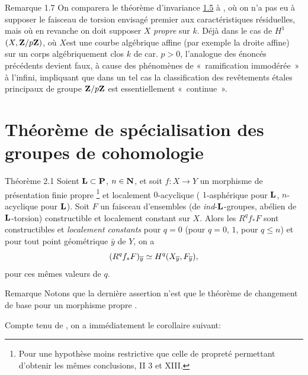 \documentclass[10pt]{../fichiers-configuration-latex/smfart}
\begin{document}
\begin{enonce*}[remark]{Remarque 1.7}
On comparera le théorème d'invariance \hyperref[XVI.cor1.5]{1.5} à
, où on n'a pas eu à supposer le faisceau de torsion
envisagé premier aux caractéristiques résiduelles, mais où en revanche
on doit supposer $X$ \emph{propre} sur $k$. Déjà dans le cas de
$H^{1}$ $(X,\mathbf{Z}/p\mathbf{Z})$, où $X$\pageoriginale est une courbe algébrique
affine (par exemple la droite affine) sur un corps algébriquement clos
$k$ de car. $p>0$, l'analogue des énoncés précédents devient faux, à
cause des phénomènes de « ramification immodérée » à l'infini,
impliquant que dans un tel cas la classification des revêtements
étales principaux de groupe $\mathbf{Z}/p\mathbf{Z}$ est essentiellement « continue ».
\end{enonce*}

\section{Théorème de spécialisation des groupes de cohomologie}

\begin{enonce*}{Théorème 2.1}
Soient $\mathbf{L}\subset \mathbf{P}$, $n\in \mathbf{N}$, et soit
$f:X\rightarrow Y$ un morphisme de présentation finie propre
\footnote[1]{Pour une hypothèse moins restrictive que celle de
  propreté permettant d'obtenir les mêmes conclusions, \cf {} II 3
et  XIII.} et localement $0$-acyclique (\resp
{} $1$-asphérique pour $\mathbf{L}$, \resp {} $n$-acyclique pour
$\mathbf{L}$). Soit $F$ un faisceau d'ensembles (\resp de
\emph{ind}-$\mathbf{L}$-groupes, \resp abélien de
$\mathbf{L}$-torsion) constructible et localement constant sur
$X$. Alors les $R^{q}f_{\ast}F$ sont constructibles et \emph{localement
constants} pour $q=0$ (\resp pour $q=0$, $1$, \resp pour $q\leq n$) et
pour tout point géométrique $\bar{y}$ de $Y$, on a
$$
(R^{q}f_{\ast}F)_{\overline{y}}\simeq
H^{q}(X_{\overline{y}},F_{\overline{y}}){},
$$
pour ces mêmes valeurs de $q$. 
\end{enonce*}

\begin{enonce*}[remark]{Remarque}
Notons que la dernière assertion n'est que le théorème de changement
de base pour un morphisme propre .
\end{enonce*}

Compte tenu de , on a immédiatement le corollaire suivant:\pageoriginale
\end{document}
